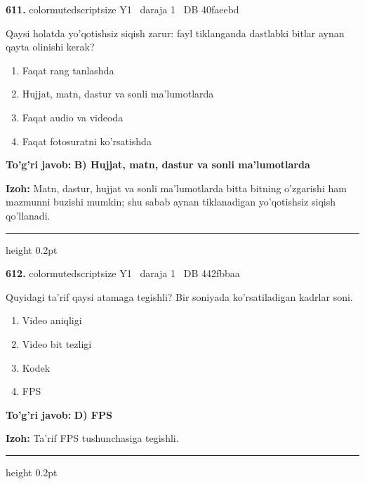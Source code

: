 \documentclass[10pt,a4paper,oneside]{article}
\begin{document}
\noindent\textbf{\color{ink}611.}  {color{muted}scriptsize Y1 \textbullet\ daraja 1 \textbullet\ DB 40faeebd}
\par
Qaysi holatda yo'qotishsiz siqish zarur: fayl tiklanganda dastlabki bitlar aynan qayta olinishi kerak?
\begin{enumerate}[label=\Alph*),leftmargin=9mm]
\item Faqat rang tanlashda
\item Hujjat, matn, dastur va sonli ma'lumotlarda
\item Faqat audio va videoda
\item Faqat fotosuratni ko'rsatishda
\end{enumerate}
\begin{tcolorbox}[enhanced,breakable,colback=teal!4,colframe=teal!50!black,boxrule=0.5pt,arc=1.1mm,left=3mm,right=3mm,top=1.7mm,bottom=1.7mm,before skip=2mm,after skip=2mm]
\textbf{\color{teal}To'g'ri javob:} \textbf{B) Hujjat, matn, dastur va sonli ma'lumotlarda}
\par\smallskip
\textbf{Izoh:} Matn, dastur, hujjat va sonli ma'lumotlarda bitta bitning o'zgarishi ham mazmunni buzishi mumkin; shu sabab aynan tiklanadigan yo'qotishsiz siqish qo'llanadi.
\end{tcolorbox}
\vspace{2mm}\hrule height 0.2pt \vspace{3mm}

\noindent\textbf{\color{ink}612.}  {color{muted}scriptsize Y1 \textbullet\ daraja 1 \textbullet\ DB 442fbbaa}
\par
Quyidagi ta'rif qaysi atamaga tegishli? Bir soniyada ko'rsatiladigan kadrlar soni.
\begin{enumerate}[label=\Alph*),leftmargin=9mm]
\item Video aniqligi
\item Video bit tezligi
\item Kodek
\item FPS
\end{enumerate}
\begin{tcolorbox}[enhanced,breakable,colback=teal!4,colframe=teal!50!black,boxrule=0.5pt,arc=1.1mm,left=3mm,right=3mm,top=1.7mm,bottom=1.7mm,before skip=2mm,after skip=2mm]
\textbf{\color{teal}To'g'ri javob:} \textbf{D) FPS}
\par\smallskip
\textbf{Izoh:} Ta'rif FPS tushunchasiga tegishli.
\end{tcolorbox}
\vspace{2mm}\hrule height 0.2pt \vspace{3mm}
\end{document}
